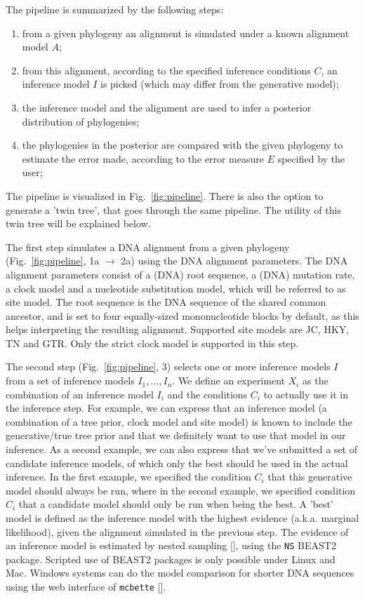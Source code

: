 \documentclass{article}
\begin{document}
The pipeline is summarized by the following steps:
\begin{enumerate}
  \item from a given phylogeny an alignment is simulated 
    under a known alignment model $\mathit{A}$;
  \item from this alignment, according to the specified inference conditions $\mathit{C}$, 
    an inference model $\mathit{I}$ is picked (which may differ from the 
    generative model);
  \item the inference model and the alignment are used 
    to infer a posterior distribution of phylogenies;
  \item the phylogenies in the posterior are compared with the given phylogeny 
    to estimate the error made, according to the error measure $\mathit{E}$ specified 
    by the user;
\end{enumerate}
The pipeline is visualized in Fig.~\ref{fig:pipeline}. 
There is also the option to generate a 'twin tree', 
that goes through the same pipeline. 
The utility of this twin tree will be explained below.

The first step simulates a DNA alignment from a given 
phylogeny (Fig.~\ref{fig:pipeline}, 1a $\rightarrow$ 2a)
using the DNA alignment parameters.
The DNA alignment parameters consist of a (DNA) root sequence, 
a (DNA) mutation rate, a clock model and a nucleotide substitution
model, which will be referred to as site model.
The root sequence is the DNA sequence of the shared common ancestor,
and is set to four equally-sized mononucleotide blocks by default, as this
helps interpreting the resulting alignment.
Supported site models are JC, HKY, TN and GTR. Only the strict
clock model is supported in this step.

The second step (Fig.~\ref{fig:pipeline}, 3)
selects one or more inference models $I$ from a set of inference 
models $I_{1},\dots,I_{n}$. 
We define an experiment $X_{i}$ as the combination of 
an inference model $I_{i}$ and the conditions $C_{i}$ 
to actually use it in the inference step.
For example, we can express that an inference
model (a combination of a tree prior, clock model and site model) 
is known to include the generative/true tree prior and that 
we definitely want to use that model in our inference. 
As a second example, we can also express that we've submitted a set of 
candidate inference models,
of which only the best should be used in the actual inference.
In the first example, we specified the condition $C_{i}$ that this
generative model should always be run, where in the second example,
we specified condition $C_{i}$ that a candidate model should only be run
when being the best.
A 'best' model is defined as the inference model with
the highest evidence (a.k.a. marginal likelihood), given the alignment 
simulated in the previous step.
The evidence of an inference model is estimated by nested 
sampling [\cite{maturana2018model}], using the \verb;NS; BEAST2 package. 
Scripted use of BEAST2 packages is only possible under Linux and Mac.
Windows systems can do the model comparison for shorter DNA sequences 
using the web interface of \verb;mcbette; [\cite{mcbette}].
\end{document}
